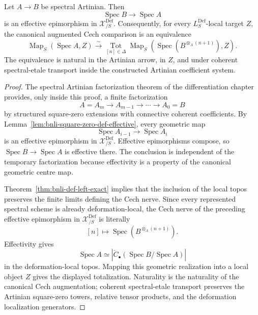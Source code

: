 \begin{theorem}
\label{thm:bnli-artinian-cech-descent}
Let $A\to B$ be spectral Artinian.  Then
\[
    \operatorname{Spec}B\longrightarrow\operatorname{Spec}A
\]
is an effective epimorphism in $\mathcal X^{\mathrm{Def}}_{/S}$.  Consequently,
for every $L_S^{\mathrm{Def}}$-local target $Z$, the canonical augmented Cech
comparison is an equivalence
\[
\boxed{
    \operatorname{Map}_S(\operatorname{Spec}A,Z)
    \xrightarrow{\sim}
    \operatorname*{Tot}_{[n]\in\Delta}
    \operatorname{Map}_S
    \left(
      \operatorname{Spec}(B^{\otimes_A(n+1)}),Z
    \right).}
\]
The equivalence is natural in the Artinian arrow, in $Z$, and under coherent
spectral-etale transport inside the constructed Artinian coefficient system.
\end{theorem}

\begin{proof}
The spectral Artinian factorization theorem of the differentiation chapter
provides, only inside this proof, a finite factorization
\[
    A=A_m\longrightarrow A_{m-1}\longrightarrow\cdots
    \longrightarrow A_0=B
\]
by structured square-zero extensions with connective coherent coefficients.
By Lemma~\ref{lem:bnli-square-zero-def-effective}, every geometric map
\[
    \operatorname{Spec}A_{i-1}
    \longrightarrow
    \operatorname{Spec}A_i
\]
is an effective epimorphism in $\mathcal X^{\mathrm{Def}}_{/S}$.  Effective
epimorphisms compose, so
$\operatorname{Spec}B\to\operatorname{Spec}A$ is effective there.  The
conclusion is independent of the temporary factorization because effectivity
is a property of the canonical geometric centre map.

Theorem~\ref{thm:bnli-def-left-exact} implies that the inclusion of the
local topos preserves the finite limits defining the Cech nerve.  Since every
represented spectral scheme is already deformation-local, the Cech nerve of
the preceding effective epimorphism in $\mathcal X^{\mathrm{Def}}_{/S}$ is
literally
\[
    [n]\longmapsto
    \operatorname{Spec}(B^{\otimes_A(n+1)}).
\]
Effectivity gives
\[
    \operatorname{Spec}A
    \simeq
    \left|
      \check C_\bullet(\operatorname{Spec}B/\operatorname{Spec}A)
    \right|
\]
in the deformation-local topos.  Mapping this geometric realization into a
local object $Z$ gives the displayed totalization.  Naturality is the
naturality of the canonical Cech augmentation; coherent spectral-etale
transport preserves the Artinian square-zero towers, relative tensor products,
and the deformation localization generators.
\end{proof}

